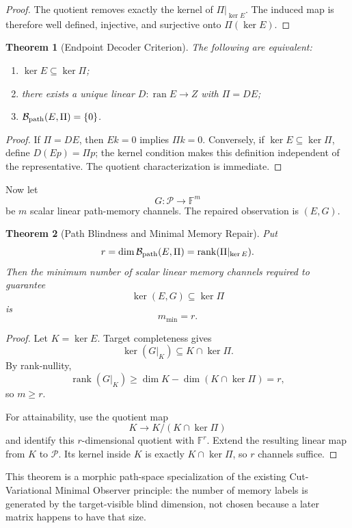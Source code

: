 \documentclass[11pt]{article}
\newtheorem{theorem}{Theorem}[section]
\begin{document}
\begin{proof}
The quotient removes exactly the kernel of \(\Pi|_{\ker E}\). The induced map is therefore well defined, injective, and surjective onto \(\Pi(\ker E)\).
\end{proof}

\begin{theorem}[Endpoint Decoder Criterion]
The following are equivalent:
\begin{enumerate}[label=(\roman*)]
\item \(\ker E\subseteq\ker\Pi\);
\item there exists a unique linear \(D:\operatorname{ran}E\to Z\) with \(\Pi=DE\);
\item \(\mathcal B_{\rm path}(E,\Pi)=\{0\}\).
\end{enumerate}
\end{theorem}

\begin{proof}
If \(\Pi=DE\), then \(Ek=0\) implies \(\Pi k=0\). Conversely, if \(\ker E\subseteq\ker\Pi\), define \(D(Ep)=\Pi p\); the kernel condition makes this definition independent of the representative. The quotient characterization is immediate.
\end{proof}

Now let
\[
G:\mathcal P\to\mathbb F^m
\]
be \(m\) scalar linear path-memory channels. The repaired observation is \((E,G)\).

\begin{theorem}[Path Blindness and Minimal Memory Repair]
Put
\[
r
=
\dim\mathcal B_{\rm path}(E,\Pi)
=
\operatorname{rank}(\Pi|_{\ker E}).
\]
Then the minimum number of scalar linear memory channels required to guarantee
\[
\ker(E,G)\subseteq\ker\Pi
\]
is
\[
\boxed{m_{\min}=r.}
\]
\end{theorem}

\begin{proof}
Let \(K=\ker E\). Target completeness gives
\[
\ker(G|_K)\subseteq K\cap\ker\Pi.
\]
By rank-nullity,
\[
\operatorname{rank}(G|_K)
\ge
\dim K-\dim(K\cap\ker\Pi)
=r,
\]
so \(m\ge r\).

For attainability, use the quotient map
\[
K\to K/(K\cap\ker\Pi)
\]
and identify this \(r\)-dimensional quotient with \(\mathbb F^r\). Extend the resulting linear map from \(K\) to \(\mathcal P\). Its kernel inside \(K\) is exactly \(K\cap\ker\Pi\), so \(r\) channels suffice.
\end{proof}

This theorem is a morphic path-space specialization of the existing Cut-Variational Minimal Observer principle: the number of memory labels is generated by the target-visible blind dimension, not chosen because a later matrix happens to have that size.
\end{document}
